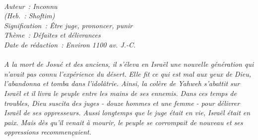 \BFont
\noindent\hrulefill
{\footnotesize
\textit{
\bigskip
{\centering{}
\\Auteur~: Inconnu
\\(Heb.~: Shoftim)
\\Signification~: Être juge, prononcer, punir
\\Thème~: Défaites et délivrances
\\Date de rédaction~: Environ 1100 av. J.-C.\\}
}
\textit{
\\A la mort de Josué et des anciens, il s'éleva en Israël une nouvelle génération qui n'avait pas connu l'expérience du désert. Elle fit ce qui est mal aux yeux de Dieu, l'abandonna et tomba dans l'idolâtrie. Ainsi, la colère de Yahweh s'abattit sur Israël et il livra le peuple entre les mains de ses ennemis. Dans ces temps de troubles, Dieu suscita des juges - douze hommes et une femme - pour délivrer Israël de ses oppresseurs. Aussi longtemps que le juge était en vie, Israël était en paix. Mais dès qu'il venait à mourir, le peuple se corrompait de nouveau et ses oppressions recommençaient.\bigskip
}
}
\par\nobreak\noindent\hrulefill
